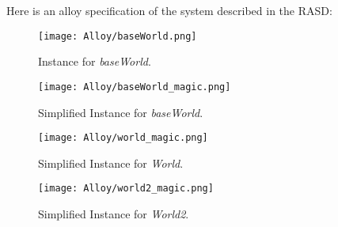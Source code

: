 Here is an alloy specification of the system described in the RASD: 
\vspace{2cm}

\newpage


\begin{figure}[H]
    \begin{center}
        \texttt{[image: Alloy/baseWorld.png]}
        \caption{Instance for \textit{baseWorld}.}
        \label{fig:baseWorld}%
    \end{center}
\end{figure}

\begin{figure}[H]
    \begin{center}
        \texttt{[image: Alloy/baseWorld\_magic.png]}
        \caption{Simplified Instance for \textit{baseWorld}.}
        \label{fig:baseWorld_magic}%
    \end{center}
\end{figure}

\begin{figure}[H]
    \begin{center}
        \texttt{[image: Alloy/world\_magic.png]}
        \caption{Simplified Instance for \textit{World}.}
        \label{fig:world_magic}%
    \end{center}
\end{figure}

\begin{figure}[H]
    \begin{center}
        \texttt{[image: Alloy/world2\_magic.png]}
        \caption{Simplified Instance for \textit{World2}.}
        \label{fig:world2_magic}%
    \end{center}
\end{figure}
